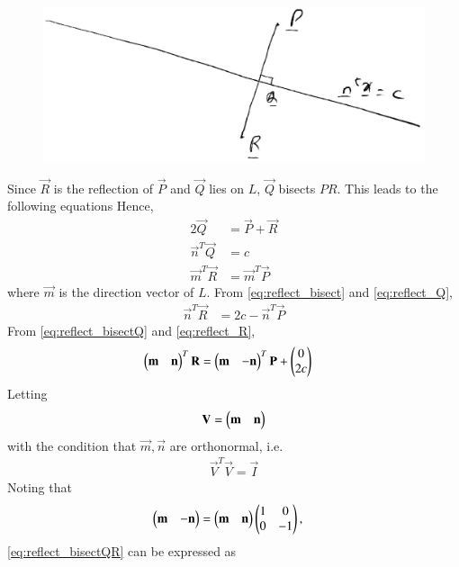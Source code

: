 \begin{enumerate}[label=\arabic*.,ref=\thesubsection.\theenumi]
%
\begin{figure}
\centering
\includegraphics[width=\columnwidth]{./line/figs/reflection.eps}
\caption{}
\label{fig:locus}
\end{figure}
\solution Since $\vec{R}$ is the reflection of $\vec{P}$ and $\vec{Q}$ lies on $L$, $\vec{Q}$ bisects $PR$.  
This leads to the following equations
Hence, 
\begin{align}
\label{eq:reflect_bisect}
2\vec{Q} &= \vec{P}+\vec{R}
\\
\label{eq:reflect_Q}
\vec{n}^{T}\vec{Q} &= c
\\
\label{eq:reflect_R}
\vec{m}^{T}\vec{R} &= \vec{m}^{T}\vec{P}
\end{align}
%
where $\vec{m}$ is the direction vector of $L$.  From \eqref{eq:reflect_bisect} and \eqref{eq:reflect_Q},
\begin{align}
\label{eq:reflect_bisectQ}
\vec{n}^{T}\vec{R}  &= 2c - \vec{n}^{T}\vec{P}
\end{align}
%
From \eqref{eq:reflect_bisectQ} and \eqref{eq:reflect_R},
\begin{align}
\label{eq:reflect_bisectQR}
\begin{pmatrix}\mathbf{m} & \mathbf{n}\end{pmatrix}^T\mathbf{R} &= \begin{pmatrix}\mathbf{m} & -\mathbf{n}\end{pmatrix}^T\mathbf{P}+ \begin{pmatrix}0 \\ 2c\end{pmatrix}
\end{align}
%
Letting 
\begin{align}
\label{eq:reflect_mat}
\mathbf{V}=  \begin{pmatrix}\mathbf{m} & \mathbf{n}\end{pmatrix}
\end{align}
with the condition that $\vec{m},\vec{n}$ are orthonormal, i.e.
\begin{align}
\label{eq:reflect_ortho}
\vec{V}^T\vec{V}=  \vec{I}
\end{align}
%
Noting that 
\begin{align}
\label{eq:reflect_trans}
\begin{pmatrix}\mathbf{m} & -\mathbf{n}\end{pmatrix} &= \begin{pmatrix}\mathbf{m} & \mathbf{n}\end{pmatrix} \begin{pmatrix}1 & 0 \\ 0 & -1\end{pmatrix},
\end{align}
\eqref{eq:reflect_bisectQR} can be expressed as
%
\begin{align}

\end{align}
\end{enumerate}
